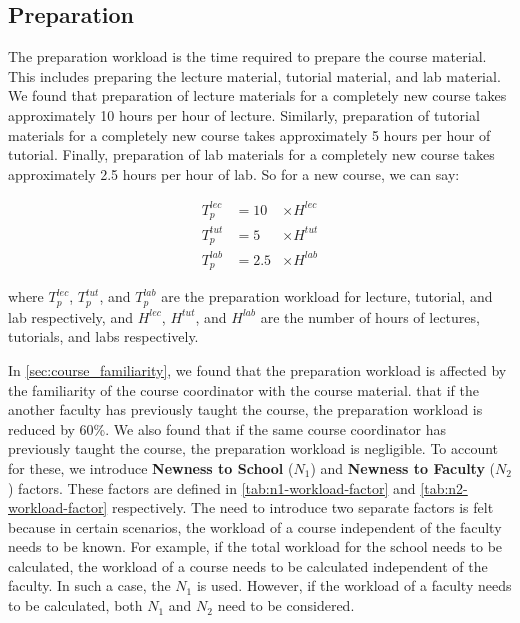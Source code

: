 \subsection{Preparation}

The preparation workload is the time required to prepare the course material. This includes preparing the lecture material, tutorial material, and lab material. We found that preparation of lecture materials for a completely new course takes approximately 10 hours per hour of lecture. Similarly, preparation of tutorial materials for a completely new course takes approximately 5 hours per hour of tutorial. Finally, preparation of lab materials for a completely new course takes approximately 2.5 hours per hour of lab. So for a new course, we can say:

\begin{equation}
  \label{eq:preparation-workload}
  \begin{aligned}
    T_p^{lec} & = 10  & \times H^{lec} \\
    T_p^{tut} & = 5   & \times H^{tut} \\
    T_p^{lab} & = 2.5 & \times H^{lab}
  \end{aligned}
\end{equation}

where \(T_p^{lec}\), \(T_p^{tut}\), and \(T_p^{lab}\) are the preparation workload for lecture, tutorial, and lab respectively, and \(H^{lec}\), \(H^{tut}\), and \(H^{lab}\) are the number of hours of lectures, tutorials, and labs respectively.

In \autoref{sec:course_familiarity}, we found that the preparation workload is affected by the familiarity of the course coordinator with the course material.  that if the another faculty has previously taught the course, the preparation workload is reduced by 60\%. We also found that if the same course coordinator has previously taught the course, the preparation workload is negligible. To account for these, we introduce \textbf{Newness to School} (\(N_1\)) and \textbf{Newness to Faculty} (\(N_2\)) factors. These factors are defined in \autoref{tab:n1-workload-factor} and \autoref{tab:n2-workload-factor} respectively. The need to introduce two separate factors is felt because in certain scenarios, the workload of a course independent of the faculty needs to be known. For example, if the total workload for the school needs to be calculated, the workload of a course needs to be calculated independent of the faculty. In such a case, the \(N_1\) is used. However, if the workload of a faculty needs to be calculated, both \(N_1\) and \(N_2\) need to be considered.

